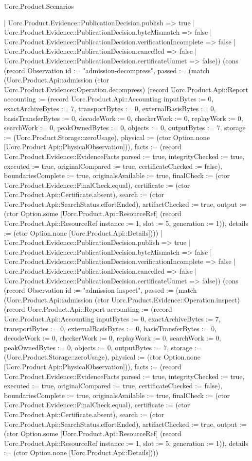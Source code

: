 \begin{lexlean}{Uorc.Product.Scenarios}
\begin{semanticmodule}
{{    | Uorc.Product.Evidence::PublicationDecision.publish => true
    | Uorc.Product.Evidence::PublicationDecision.byteMismatch => false
    | Uorc.Product.Evidence::PublicationDecision.verificationIncomplete => false
    | Uorc.Product.Evidence::PublicationDecision.cancelled => false
    | Uorc.Product.Evidence::PublicationDecision.certificateUnmet => false)}) (cons (record Observation {id := "admission-decompress", passed := (match (Uorc.Product.Api::admission (ctor Uorc.Product.Evidence::Operation.decompress) (record Uorc.Product.Api::Report {accounting := (record Uorc.Product.Api::Accounting {inputBytes := 0, exactArchiveBytes := 7, transportBytes := 0, externalBasisBytes := 0, basisTransferBytes := 0, decodeWork := 0, checkerWork := 0, replayWork := 0, searchWork := 0, peakOwnedBytes := 0, objects := 0, outputBytes := 7, storage := (Uorc.Product.Storage::zeroUsage), physical := (ctor Option.none [Uorc.Product.Api::PhysicalObservation])}), facts := (record Uorc.Product.Evidence::EvidenceFacts {parsed := true, integrityChecked := true, executed := true, originalCompared := true, certificateChecked := false}), boundariesComplete := true, originalsAvailable := true, finalCheck := (ctor Uorc.Product.Evidence::FinalCheck.equal), certificate := (ctor Uorc.Product.Api::Certificate.absent), search := (ctor Uorc.Product.Api::SearchStatus.effortEnded), artifactChecked := true, output := (ctor Option.some [Uorc.Product.Api::ResourceRef] (record Uorc.Product.Api::ResourceRef {instance := 1, slot := 5, generation := 1})), details := (ctor Option.none [Uorc.Product.Api::Details])}))
    | Uorc.Product.Evidence::PublicationDecision.publish => true
    | Uorc.Product.Evidence::PublicationDecision.byteMismatch => false
    | Uorc.Product.Evidence::PublicationDecision.verificationIncomplete => false
    | Uorc.Product.Evidence::PublicationDecision.cancelled => false
    | Uorc.Product.Evidence::PublicationDecision.certificateUnmet => false)}) (cons (record Observation {id := "admission-inspect", passed := (match (Uorc.Product.Api::admission (ctor Uorc.Product.Evidence::Operation.inspect) (record Uorc.Product.Api::Report {accounting := (record Uorc.Product.Api::Accounting {inputBytes := 0, exactArchiveBytes := 7, transportBytes := 0, externalBasisBytes := 0, basisTransferBytes := 0, decodeWork := 0, checkerWork := 0, replayWork := 0, searchWork := 0, peakOwnedBytes := 0, objects := 0, outputBytes := 7, storage := (Uorc.Product.Storage::zeroUsage), physical := (ctor Option.none [Uorc.Product.Api::PhysicalObservation])}), facts := (record Uorc.Product.Evidence::EvidenceFacts {parsed := true, integrityChecked := true, executed := true, originalCompared := true, certificateChecked := false}), boundariesComplete := true, originalsAvailable := true, finalCheck := (ctor Uorc.Product.Evidence::FinalCheck.equal), certificate := (ctor Uorc.Product.Api::Certificate.absent), search := (ctor Uorc.Product.Api::SearchStatus.effortEnded), artifactChecked := true, output := (ctor Option.some [Uorc.Product.Api::ResourceRef] (record Uorc.Product.Api::ResourceRef {instance := 1, slot := 5, generation := 1})), details := (ctor Option.none [Uorc.Product.Api::Details])}))
}}
\end{semanticmodule}
\end{lexlean}
